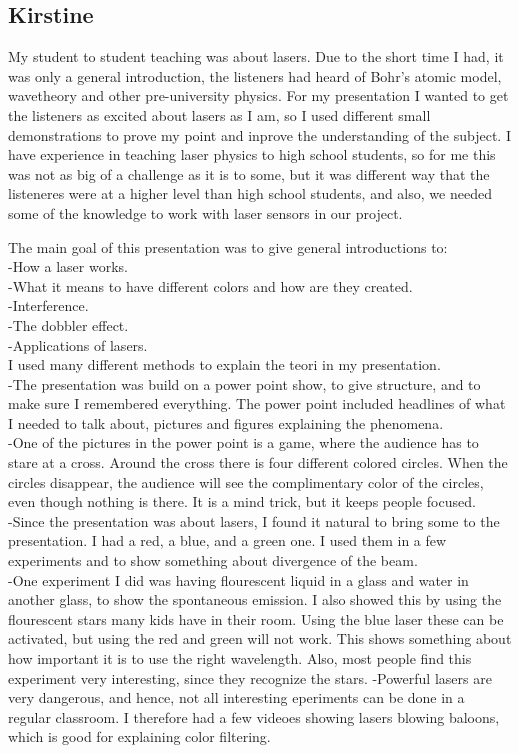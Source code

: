 \subsection{Kirstine}
My student to student teaching was about lasers. Due to the short time I had, it was only a general introduction, the listeners had heard of Bohr's atomic model, wavetheory and other pre-university physics. For my presentation I wanted to get the listeners as excited about lasers as I am, so I used different small demonstrations to prove my point and inprove the understanding of the subject. I have experience in teaching laser physics to high school students, so for me this was not as big of a challenge as it is to some, but it was different way that the listeneres were at a higher level than high school students, and also, we needed some of the knowledge to work with laser sensors in our project.

The main goal of this presentation was to give general introductions to:\\
-How a laser works.\\
-What it means to have different colors and how are they created.\\
-Interference.\\
-The dobbler effect.\\
-Applications of lasers.\\


I used many different methods to explain the teori in my presentation. \\
-The presentation was build on a power point show, to give structure, and to make sure I remembered everything. The power point included headlines of what I needed to talk about, pictures and figures explaining the phenomena.\\
-One of the pictures in the power point is a game, where the audience has to stare at a cross. Around the cross there is four different colored circles. When the circles disappear, the audience will see the complimentary color of the circles, even though nothing is there. It is a mind trick, but it keeps people focused. \\
-Since the presentation was about lasers, I found it natural to bring some to the presentation. I had a red, a blue, and a green one. I used them in a few experiments and to show something about divergence of the beam. \\
-One experiment I did was having flourescent liquid in a glass and water in another glass, to show the spontaneous emission. I also showed this by using the flourescent stars many kids have in their room. Using the blue laser these can be activated, but using the red and green will not work. This shows something about how important it is to use the right wavelength. Also, most people find this experiment very interesting, since they recognize the stars. 
-Powerful lasers are very dangerous, and hence, not all interesting eperiments can be done in a regular classroom. I therefore had a few videoes showing lasers blowing baloons, which is good for explaining color filtering. 


